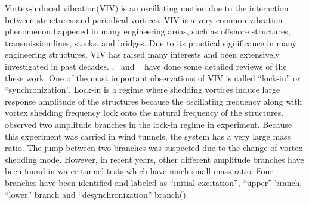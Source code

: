 Vortex-induced vibration(VIV) is an oscillating motion due to the interaction
between structures and periodical vortices. VIV is a very common vibration
phenomenon happened in many engineering areas, such as offshore structures,
transmission lines, stacks, and bridges. Due to its practical significance in
many engineering structures, VIV has raised many interests and been extensively
investigated in past decades.
\cite{bearman1984vortex},~\cite{sarpkaya2004critical} and
~\cite{williamson2004vortex} have done some detailed reviews of the these work.
One of the most important observations of VIV is called ``lock-in'' or
``synchronization''. Lock-in is a regime where shedding vortices induce large
response amplitude of the structures because the oscillating frequency along
with vortex shedding frequency lock onto the natural frequency of the
structures. ~\cite{feng1968measurement} observed two amplitude branches in the
lock-in regime in experiment. Because this experiment was carried in wind
tunnels, the system has a very large mass ratio. The jump between two branches
was suspected due to the change of vortex shedding mode. However, in recent
years, other different amplitude branches have been found in water tunnel tests
which have much small mass ratio. Four branches have been identified and
labeled as ``initial excitation'', ``upper'' branch, ``lower'' branch and
``desynchronization'' branch(\cite{khalak1997fluid}). 

